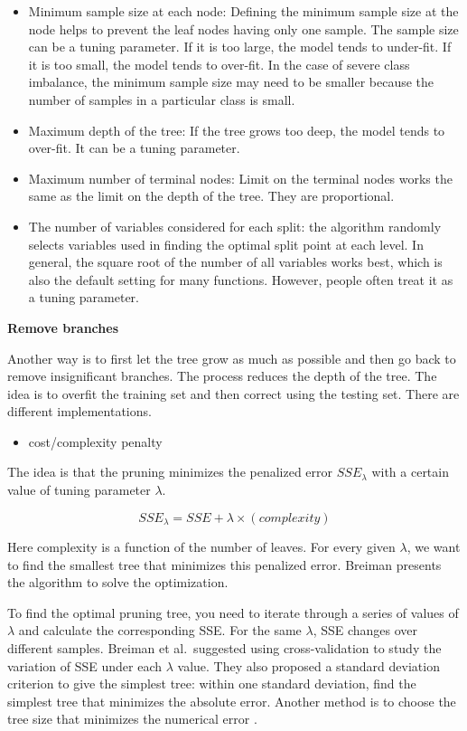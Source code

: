 \documentclass[12pt,]{krantz}
\providecommand{\tightlist}{%
  \setlength{\itemsep}{0pt}\setlength{\parskip}{0pt}}
\begin{document}
\begin{itemize}
\item
  Minimum sample size at each node: Defining the minimum sample size at the node helps to prevent the leaf nodes having only one sample. The sample size can be a tuning parameter. If it is too large, the model tends to under-fit. If it is too small, the model tends to over-fit. In the case of severe class imbalance, the minimum sample size may need to be smaller because the number of samples in a particular class is small.
\item
  Maximum depth of the tree: If the tree grows too deep, the model tends to over-fit. It can be a tuning parameter.
\item
  Maximum number of terminal nodes: Limit on the terminal nodes works the same as the limit on the depth of the tree. They are proportional.
\item
  The number of variables considered for each split: the algorithm randomly selects variables used in finding the optimal split point at each level. In general, the square root of the number of all variables works best, which is also the default setting for many functions. However, people often treat it as a tuning parameter.
\end{itemize}

\textbf{Remove branches}

Another way is to first let the tree grow as much as possible and then go back to remove insignificant branches. The process reduces the depth of the tree. The idea is to overfit the training set and then correct using the testing set. There are different implementations.

\begin{itemize}
\tightlist
\item
  cost/complexity penalty
\end{itemize}

The idea is that the pruning minimizes the penalized error \(SSE_{\lambda}\) with a certain value of tuning parameter \(\lambda\).

\[SSE_{\lambda} = SSE+\lambda \times (complexity)\]

Here complexity is a function of the number of leaves. For every given \(\lambda\), we want to find the smallest tree that minimizes this penalized error. Breiman presents the algorithm to solve the optimization\citep{Breiman1984}.

To find the optimal pruning tree, you need to iterate through a series of values of \(\lambda\) and calculate the corresponding SSE. For the same \(\lambda\), SSE changes over different samples. Breiman et al.~suggested using cross-validation \citep{Breiman1984} to study the variation of SSE under each \(\lambda\) value. They also proposed a standard deviation criterion to give the simplest tree: within one standard deviation, find the simplest tree that minimizes the absolute error. Another method is to choose the tree size that minimizes the numerical error \citep{Hastie2008}.
\end{document}
